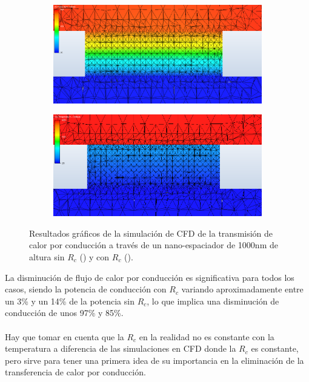 \graphicspath{ {./figuras/Resultados/conduccion/} }
\begin{figure}[H]
	\centering 		%
	\begin{subfigure}[b]{0.49\textwidth}
	\centering
		\includegraphics[width=1.00\textwidth]{SiSiO2Si_1000nm_Plane2.png}
		\caption{ }
	\label{fig:Pcond_SiSiO2Si_CFD}
\end{subfigure}
\hfill 					%
\begin{subfigure}[b]{0.49\textwidth}
	\centering
		\includegraphics[width=1.00\textwidth]{SiSiO2Si_1000nm_Plane_Rc.png}
		\caption{ }
	\label{fig:Pcond_SiSiO2Si_Rc_CFD}
\end{subfigure}
\caption{Resultados gráficos de la simulación de CFD de la transmisión de calor por conducción a través de un nano-espaciador de 1000nm de altura sin $R_c$ () y con $R_c$ ().}
	\label{fig:Pconds_SiSiO2Si_CFD}
\end{figure}
La disminución de flujo de calor por conducción es significativa para todos los casos, siendo la potencia de conducción con $R_c$ variando aproximadamente entre un 3\% y un 14\% de la potencia sin $R_c$, lo que implica una disminución de conducción de unos 97\% y 85\%.\\\\
Hay que tomar en cuenta que la $R_c$ en la realidad no es constante con la temperatura a diferencia de las simulaciones en CFD donde la $R_c$ es constante, pero sirve para tener una primera idea de su importancia en la eliminación de la transferencia de calor por conducción.
